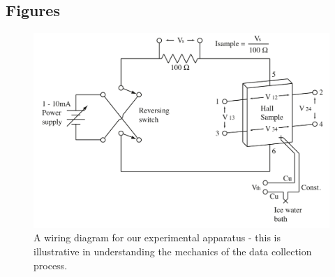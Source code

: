 \documentclass[reprint, nobibnotes, amssymb, amsmath, amsfonts, physics, mathtools, mathrsfs, floatfix]{revtex4-1}
\begin{document}
    \hspace{.5cm}

    \subsection{Figures}

    \begin{widetext}

      \begin{figure}[h]
        \centering
        \includegraphics[width=\linewidth]{circuit_diagram.png}
        \caption{A wiring diagram for our experimental apparatus - this is illustrative in understanding the mechanics of the data collection process.~\label{circuit_diagram}~\cite{lab_manual}}
      \end{figure}


\end{widetext}
\end{document}
